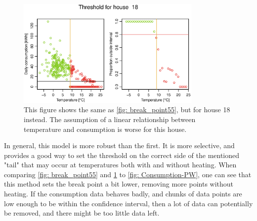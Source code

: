 \begin{figure}
    \centering
    \includegraphics[width=0.8\textwidth]{../../../figures/breakpoint_18.eps}
    \caption{This figure shows the same as \cref{fig: break_point55}, but for house 18 instead. The assumption of a linear relationship between temperature and consumption is worse for this house.}
    \label{fig: break_point18}
\end{figure}
\noindent In general, this model is more robust than the first. It is more selective, and provides a good way to set the threshold on the correct side of the mentioned "tail" that may occur at temperatures both with and without heating.
When comparing \cref{fig: break_point55} and \cref{fig: break_point18} to \cref{fig: Consumption-PW}, one can see that this method sets the break point a bit lower, removing more points without heating. If the consumption data behaves badly, and chunks of data points are low enough to be within the confidence interval, then a lot of data can potentially be removed, and there might be too little data left.

